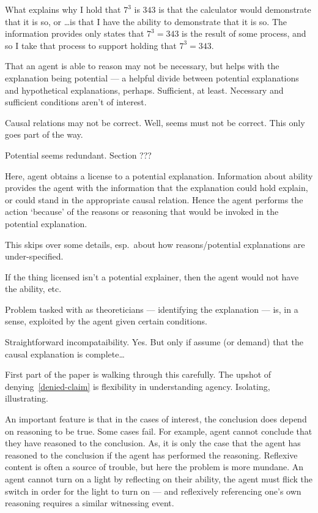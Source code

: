 \documentclass[10pt]{article}
\newcommand{\hozlinedash}[0]{%
  \noindent\hdashrule[0.5ex][c]{\textwidth}{.1pt}{2.5pt}
}
\begin{document}
What explains why I hold that \(7^{3}\) is \(343\) is that the calculator would demonstrate that it is so, or \dots is that I have the ability to demonstrate that it is so.
The information provides only states that \(7^{3} = 343\) is the result of some process, and so I take that process to support holding that \(7^{3} = 343\).

\hozlinedash





That an agent is able to reason may not be necessary, but helps with the explanation being potential --- a helpful divide between potential explanations and hypothetical explanations, perhaps.
Sufficient, at least.
Necessary and sufficient conditions aren't of interest.


Causal relations may not be correct.
Well, seems must not be correct.
This only goes part of the way.

Potential seems redundant.
Section ???










Here, agent obtains a license to a potential explanation.
Information about ability provides the agent with the information that the explanation could hold explain, or could stand in the appropriate causal relation.
Hence the agent performs the action `because' of the reasons or reasoning that would be invoked in the potential explanation.

{
\color{red} This skips over some details, esp.\ about how reasons/potential explanations are under-specified.
}

If the thing licensed isn't a potential explainer, then the agent would not have the ability, etc.\

Problem tasked with as theoreticians --- identifying the explanation --- is, in a sense, exploited by the agent given certain conditions.

Straightforward incompataibility.
Yes.
But only if assume (or demand) that the causal explanation is complete\dots




{
  \color{red}
  First part of the paper is walking through this carefully.
}
The upshot of denying~\ref{denied-claim} is flexibility in understanding agency.
Isolating, illustrating.



An important feature is that in the cases of interest, the conclusion does depend on reasoning to be true.
Some cases fail.
For example, agent cannot conclude that they have reasoned to the conclusion.
As, it is only the case that the agent has reasoned to the conclusion if the agent has performed the reasoning.
Reflexive content is often a source of trouble, but here the problem is more mundane.
An agent cannot turn on a light by reflecting on their ability, the agent must flick the switch in order for the light to turn on --- and reflexively referencing one's own reasoning requires a similar witnessing event.
\end{document}
